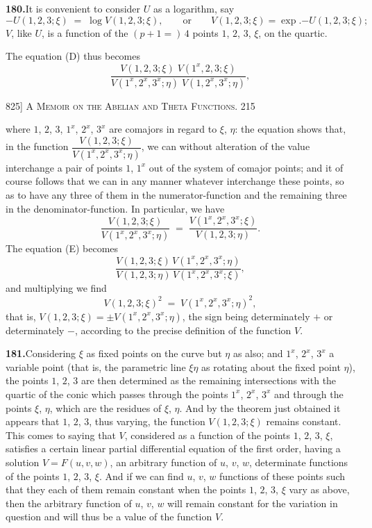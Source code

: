 \documentclass[11pt]{article}
\begin{document}
\textbf{180.}\quad It is convenient to consider $U$ as a logarithm, say
\[
-U(1,2,3;\xi) \;=\; \log V(1,2,3;\xi),\qquad\text{or}\qquad V(1,2,3;\xi) = \exp.{-U(1,2,3;\xi)};
\]
$V$, like $U$, is a function of the $(p+1=)\,4$ points $1$, $2$, $3$, $\xi$, on the quartic.

The equation (D) thus becomes
\[
\frac{V(1,2,3;\xi)\;V(1^{x},2,3;\xi)}{V(1^{x},2^{x},3^{x};\eta)\;V(1,2^{x},3^{x};\eta)},
\]

\newpage
\noindent\textsc{825] \hfill A Memoir on the Abelian and Theta Functions. \hfill 215}
\vspace{0.6em}

\noindent
where $1$, $2$, $3$, $1^{x}$, $2^{x}$, $3^{x}$ are comajors in regard to $\xi$, $\eta$: the equation shows that, in
the function $\dfrac{V(1,2,3;\xi)}{V(1^{x},2^{x},3^{x};\eta)}$, we can without alteration of the value interchange a
pair of points $1$, $1^{x}$ out of the system of comajor points; and it of course follows
that we can in any manner whatever interchange these points, so as to have any
three of them in the numerator-function and the remaining three in the denominator-function.
In particular, we have
\[
\frac{V(1,2,3;\xi)}{V(1^{x},2^{x},3^{x};\eta)} \;=\; \frac{V(1^{x},2^{x},3^{x};\xi)}{V(1,2,3;\eta)}.
\]
The equation (E) becomes
\[
\frac{V(1,2,3;\xi)\,V(1^{x},2^{x},3^{x};\eta)}{V(1,2,3;\eta)\,V(1^{x},2^{x},3^{x};\xi)},
\]
and multiplying we find
\[
V(1,2,3;\xi)^{2} \;=\; V(1^{x},2^{x},3^{x};\eta)^{2},
\]
that is, $V(1,2,3;\xi) = \pm V(1^{x},2^{x},3^{x};\eta)$, the sign being determinately $+$ or determ\-inately $-$,
according to the precise definition of the function $V$.

\medskip
\textbf{181.}\quad Considering $\xi$ as fixed points on the curve but $\eta$ as also; and $1^{x}$, $2^{x}$, $3^{x}$
a variable point (that is, the parametric line $\xi\eta$ as rotating about the fixed point $\eta$),
the points $1$, $2$, $3$ are then determined as the remaining intersections with the quartic of
the conic which passes through the points $1^{x}$, $2^{x}$, $3^{x}$ and through the points $\xi$, $\eta$, which
are the residues of $\xi$, $\eta$.  And by the theorem just obtained it appears that $1$, $2$, $3$,
thus varying, the function $V(1,2,3;\xi)$ remains constant.  This comes to saying that
$V$, considered as a function of the points $1$, $2$, $3$, $\xi$, satisfies a certain linear partial
differential equation of the first order, having a solution $V = F(u,v,w)$, an arbitrary
function of $u$, $v$, $w$, determinate functions of the points $1$, $2$, $3$, $\xi$.  And if we can
find $u$, $v$, $w$ functions of these points such that they each of them remain constant
when the points $1$, $2$, $3$, $\xi$ vary as above, then the arbitrary function of $u$, $v$, $w$ will
remain constant for the variation in question and will thus be a value of the function $V$.
\end{document}
